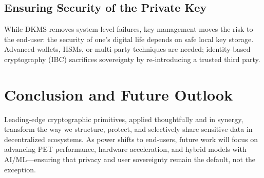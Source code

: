 \subsection{Ensuring Security of the Private Key}
While DKMS removes system-level failures, key management moves the risk to the end-user: the security of one's digital life depends on safe local key storage. Advanced wallets, HSMs, or multi-party techniques are needed; identity-based cryptography (IBC) sacrifices sovereignty by re-introducing a trusted third party.

\section*{Conclusion and Future Outlook}
Leading-edge cryptographic primitives, applied thoughtfully and in synergy, transform the way we structure, protect, and selectively share sensitive data in decentralized ecosystems. As power shifts to end-users, future work will focus on advancing PET performance, hardware acceleration, and hybrid models with AI/ML—ensuring that privacy and user sovereignty remain the default, not the exception.

